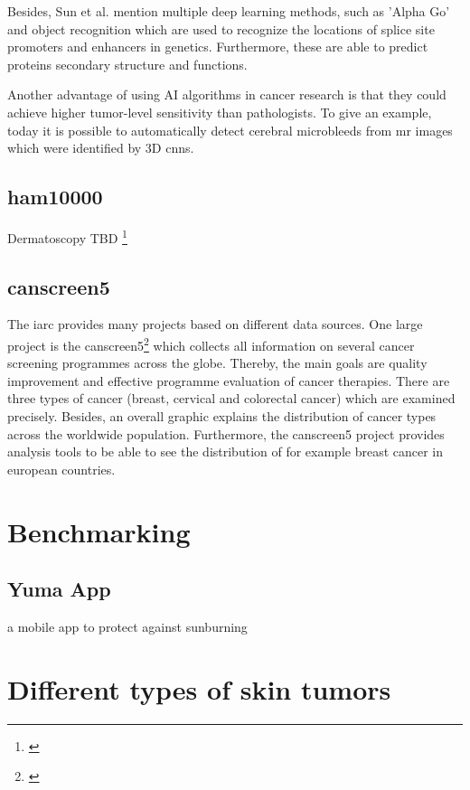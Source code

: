 Besides, Sun et al. mention multiple deep learning methods, such as 'Alpha Go' and object recognition which are used to recognize the locations of splice site promoters and enhancers in genetics. Furthermore, these are able to predict proteins secondary structure and functions.

Another advantage of using AI algorithms in cancer research is that they could achieve higher tumor-level sensitivity than pathologists. To give an example, today it is possible to automatically detect cerebral microbleeds from \ac{mr} images which were identified by 3D \ac{cnn}s.

\subsection{\ac{ham10000}}
Dermatoscopy TBD 
\footnote{\cite{ham10000}}

\subsection{\ac{canscreen5}}

The \ac{iarc} provides many projects based on different data sources. One large project is the \ac{canscreen5}\footnote{\cite{iarc_canscreen5_project}} which collects all information on several cancer screening programmes across the globe. Thereby, the main goals are quality improvement and effective programme evaluation of cancer therapies. There are three types of cancer (breast, cervical and colorectal cancer) which are examined precisely. Besides, an overall graphic explains the distribution of cancer types across the worldwide population. Furthermore, the \ac{canscreen5} project provides analysis tools to be able to see the distribution of for example breast cancer in european countries.  

\section{Benchmarking}
\subsection{Yuma App}
a mobile app to protect against sunburning

\section{Different types of skin tumors}

